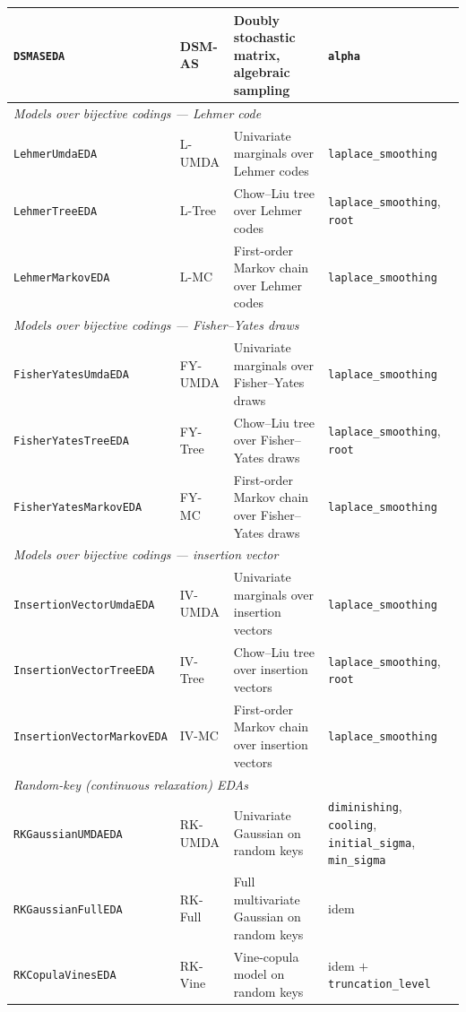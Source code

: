 \documentclass[a4paper,11pt]{article}
\begin{document}
\begin{center}
\begin{longtable}{llp{5.0cm}p{3.0cm}}
\texttt{DSMASEDA}            & DSM-AS     & Doubly stochastic matrix, algebraic sampling \citep{Santucci_and_Ceberio:2023} & \texttt{alpha} \\
\midrule
\multicolumn{4}{l}{\emph{Models over bijective codings --- Lehmer code}}\\
\texttt{LehmerUmdaEDA}       & L-UMDA     & Univariate marginals over Lehmer codes \citep{RegnierCoudert_and_McCall:2014} & \texttt{laplace\_smoothing} \\
\texttt{LehmerTreeEDA}       & L-Tree     & Chow--Liu tree over Lehmer codes \citep{Chow_and_Liu:1968} & \texttt{laplace\_smoothing}, \texttt{root} \\
\texttt{LehmerMarkovEDA}     & L-MC       & First-order Markov chain over Lehmer codes & \texttt{laplace\_smoothing} \\
\midrule
\multicolumn{4}{l}{\emph{Models over bijective codings --- Fisher--Yates draws}}\\
\texttt{FisherYatesUmdaEDA}  & FY-UMDA    & Univariate marginals over Fisher--Yates draws \citep{Durstenfeld:1964} & \texttt{laplace\_smoothing} \\
\texttt{FisherYatesTreeEDA}  & FY-Tree    & Chow--Liu tree over Fisher--Yates draws & \texttt{laplace\_smoothing}, \texttt{root} \\
\texttt{FisherYatesMarkovEDA} & FY-MC     & First-order Markov chain over Fisher--Yates draws & \texttt{laplace\_smoothing} \\
\midrule
\multicolumn{4}{l}{\emph{Models over bijective codings --- insertion vector}}\\
\texttt{InsertionVectorUmdaEDA} & IV-UMDA & Univariate marginals over insertion vectors & \texttt{laplace\_smoothing} \\
\texttt{InsertionVectorTreeEDA} & IV-Tree & Chow--Liu tree over insertion vectors & \texttt{laplace\_smoothing}, \texttt{root} \\
\texttt{InsertionVectorMarkovEDA} & IV-MC & First-order Markov chain over insertion vectors & \texttt{laplace\_smoothing} \\
\midrule
\multicolumn{4}{l}{\emph{Random-key (continuous relaxation) EDAs}}\\
\texttt{RKGaussianUMDAEDA}   & RK-UMDA    & Univariate Gaussian on random keys \citep{Ayodele_et_al:2016} & \texttt{diminishing}, \texttt{cooling}, \texttt{initial\_sigma}, \texttt{min\_sigma} \\
\texttt{RKGaussianFullEDA}   & RK-Full    & Full multivariate Gaussian on random keys & idem \\
\texttt{RKCopulaVinesEDA}    & RK-Vine    & Vine-copula model on random keys & idem $+$ \texttt{truncation\_level} \\
\bottomrule
\end{longtable}
\end{center}
\end{document}
